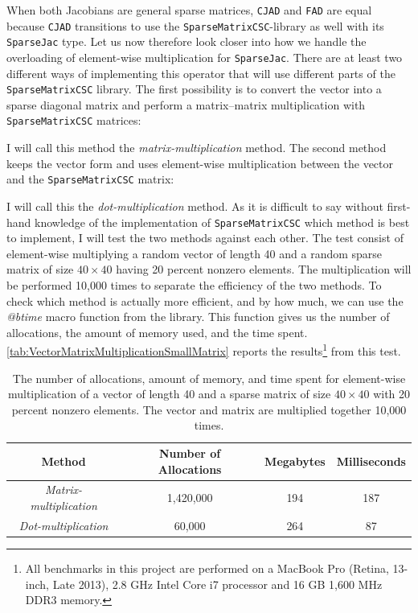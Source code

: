 When both Jacobians are general sparse matrices, \texttt{CJAD} and \texttt{FAD} are equal because \texttt{CJAD} transitions to use the \texttt{SparseMatrixCSC}-library as well with its \texttt{SparseJac} type. Let us now therefore look closer into how we handle the overloading of element-wise multiplication for \texttt{SparseJac}.  There are at least two different ways of implementing this operator that will use different parts of the \texttt{SparseMatrixCSC} library. The first possibility is to convert the vector into a sparse diagonal matrix and perform a matrix--matrix multiplication with \texttt{SparseMatrixCSC} matrices:

I will call this method the \textit{matrix-multiplication} method. The second method keeps the vector form and uses element-wise multiplication between the vector and the \texttt{SparseMatrixCSC} matrix:

I will call this the \textit{dot-multiplication} method. As it is difficult to say without first-hand knowledge of the implementation of \texttt{SparseMatrixCSC} which method is best to implement, I will test the two methods against each other. The test consist of element-wise multiplying a random vector of length 40 and a random sparse matrix of size $40\times40$ having 20 percent nonzero elements. The multiplication will be performed 10,000 times to separate the efficiency of the two methods. To check which method is actually more efficient, and by how much, we can use the \textit{@btime} macro function from the \emph{\cite{BenchmarkTools}} library. This function gives us the number of allocations, the amount of memory used, and the time spent.
\autoref{tab:VectorMatrixMultiplicationSmallMatrix} reports the results\footnote{All benchmarks in this project are performed on a MacBook Pro (Retina, 13-inch, Late 2013), 2.8 GHz Intel Core i7 processor and 16 GB 1,600 MHz DDR3 memory.} from this test.
\begin{table}[H]
    \centering
    \caption{The number of allocations, amount of memory, and time spent for element-wise multiplication of a vector of length 40 and a sparse matrix of size $40\times 40$ with 20 percent nonzero elements. The vector and matrix are multiplied together 10,000 times.}
    \label{tab:VectorMatrixMultiplicationSmallMatrix}
    \def\arraystretch{1.5}
    \begin{tabular}{cccc}
    \textbf{Method} & \textbf{Number of Allocations} & \textbf{Megabytes} & \textbf{Milliseconds} \\
        \hline
         \textit{Matrix-multiplication} & 1,420,000 & 194 & 187 \\  
         \textit{Dot-multiplication} & 60,000 & 264 & 87\\ 
         \hline
    \end{tabular}
\end{table}
